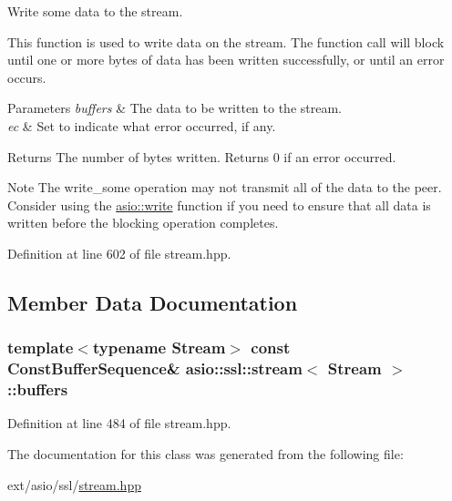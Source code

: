 Write some data to the stream. 

This function is used to write data on the stream. The function call will block until one or more bytes of data has been written successfully, or until an error occurs.


\begin{DoxyParams}{Parameters}
{\em buffers} & The data to be written to the stream.\\
\hline
{\em ec} & Set to indicate what error occurred, if any.\\
\hline
\end{DoxyParams}
\begin{DoxyReturn}{Returns}
The number of bytes written. Returns 0 if an error occurred.
\end{DoxyReturn}
\begin{DoxyNote}{Note}
The write\+\_\+some operation may not transmit all of the data to the peer. Consider using the \hyperlink{group__write}{asio\+::write} function if you need to ensure that all data is written before the blocking operation completes. 
\end{DoxyNote}


Definition at line 602 of file stream.\+hpp.



\subsection{Member Data Documentation}
\hypertarget{classasio_1_1ssl_1_1stream_aefa76c1cfe5178bd3e49d3fe06272133}{}
\subsubsection[{buffers}]{\setlength{\rightskip}{0pt plus 5cm}template$<$typename Stream$>$ const Const\+Buffer\+Sequence\& {\bf asio\+::ssl\+::stream}$<$ Stream $>$\+::buffers}\label{classasio_1_1ssl_1_1stream_aefa76c1cfe5178bd3e49d3fe06272133}


Definition at line 484 of file stream.\+hpp.



The documentation for this class was generated from the following file\+:\begin{DoxyCompactItemize}
\item 
ext/asio/ssl/\hyperlink{stream_8hpp}{stream.\+hpp}\end{DoxyCompactItemize}
